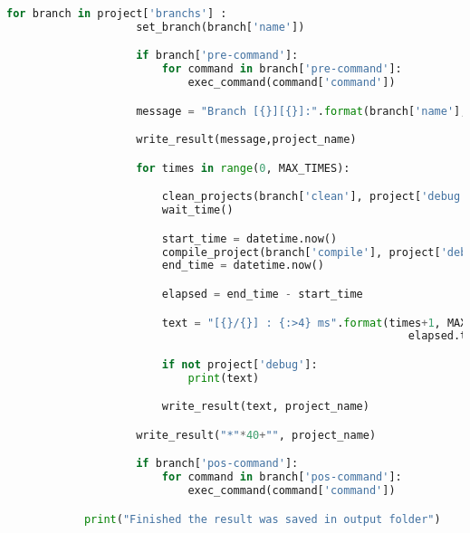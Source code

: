 \begin{apendicesenv}
\begin{lstlisting}[language=Python, caption={Script de Recompilações},
                  label=script_recompilacoes]
                for branch in project['branchs'] :
                    set_branch(branch['name'])

                    if branch['pre-command']:
                        for command in branch['pre-command']:
                            exec_command(command['command'])

                    message = "Branch [{}][{}]:".format(branch['name'],branch['description'])

                    write_result(message,project_name)

                    for times in range(0, MAX_TIMES):

                        clean_projects(branch['clean'], project['debug'])
                        wait_time()

                        start_time = datetime.now()
                        compile_project(branch['compile'], project['debug'])
                        end_time = datetime.now()

                        elapsed = end_time - start_time

                        text = "[{}/{}] : {:>4} ms".format(times+1, MAX_TIMES,
                                                              elapsed.total_seconds())

                        if not project['debug']:
                            print(text)

                        write_result(text, project_name)

                    write_result("*"*40+"", project_name)

                    if branch['pos-command']:
                        for command in branch['pos-command']:
                            exec_command(command['command'])

            print("Finished the result was saved in output folder")
\end{lstlisting}


\end{apendicesenv}

